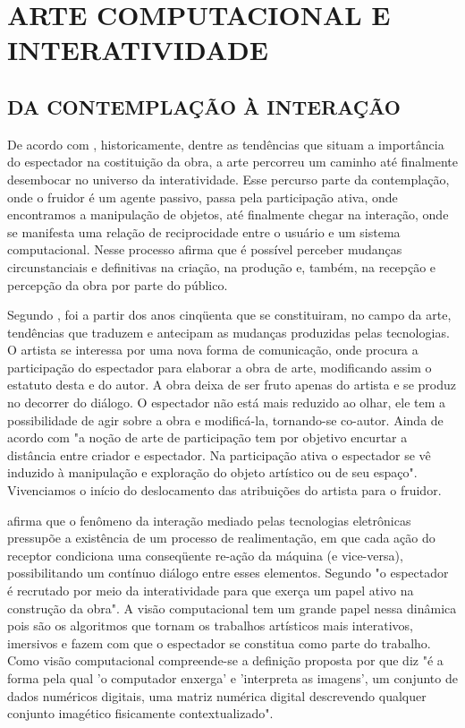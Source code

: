 \chapter{ARTE COMPUTACIONAL E INTERATIVIDADE}

\section{DA CONTEMPLAÇÃO À INTERAÇÃO}

De acordo com , historicamente, dentre as tendências que situam a importância do espectador na costituição da obra, a arte percorreu um caminho até finalmente desembocar no universo da interatividade. Esse percurso parte da contemplação, onde o fruidor é um agente passivo, passa pela participação ativa, onde encontramos a manipulação de objetos, até finalmente chegar na interação, onde se manifesta uma relação de reciprocidade entre o usuário e um sistema computacional. Nesse processo  afirma que é possível perceber mudanças circunstanciais e definitivas na criação, na produção e, também, na recepção e percepção da obra por parte do público. 

Segundo , foi a partir dos anos cinqüenta que se constituiram, no campo da arte, tendências que traduzem e antecipam as mudanças produzidas pelas tecnologias. O artista se interessa por uma nova forma de comunicação, onde procura a participação do espectador para elaborar a obra de arte, modificando assim o estatuto desta e do autor. A obra deixa de ser fruto apenas do artista e se produz no decorrer do diálogo. O espectador não está mais reduzido ao olhar, ele tem a possibilidade de agir sobre a obra e modificá-la, tornando-se co-autor. Ainda de acordo com  "a noção de arte de participação tem por objetivo encurtar a distância entre criador e espectador. Na participação ativa o espectador se vê induzido à manipulação e exploração do objeto artístico ou de seu espaço". Vivenciamos o início do deslocamento das atribuições do artista para o fruidor. 

 afirma que o fenômeno da interação mediado pelas tecnologias eletrônicas pressupõe a existência de um processo de realimentação, em que cada ação do receptor condiciona uma conseqüente re-ação da máquina (e vice-versa), possibilitando um contínuo diálogo entre esses elementos. Segundo  "o espectador é recrutado por meio da interatividade para que exerça um papel ativo na construção da obra". A visão computacional tem um grande papel nessa dinâmica pois são os algoritmos que tornam os trabalhos artísticos mais interativos, imersivos e fazem com que o espectador se constitua como parte do trabalho. Como visão computacional compreende-se a definição proposta por  que diz "é a forma pela qual 'o computador enxerga' e 'interpreta as imagens', um conjunto de dados numéricos digitais, uma matriz numérica digital descrevendo qualquer conjunto imagético fisicamente contextualizado".

